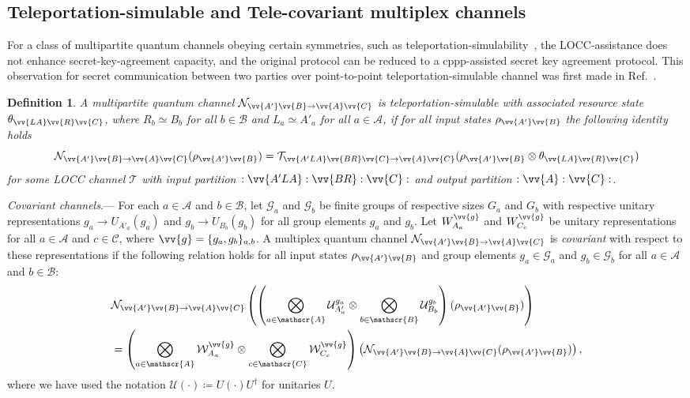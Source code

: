 \documentclass[aps,pra,twocolumn,superscriptaddress,longbibliography]{revtex4-1}
\def\({\left(}
\def\){\right)}
\newcommand{\mc}[1]{\mathcal{#1}}
\newcommand{\msc}[1]{\mathscr{#1}}
\newtheorem{definition}{Definition}
\begin{document}
\subsection{Teleportation-simulable and Tele-covariant multiplex channels}\label{sec:tele-cov}
For a class of multipartite quantum channels obeying certain symmetries, such as teleportation-simulability~\cite{BBPS96}, the LOCC-assistance does not enhance secret-key-agreement capacity, and the original protocol can be reduced to a cppp-assisted secret key agreement protocol. This observation for secret communication between two parties over point-to-point teleportation-simulable channel was first made in Ref.~\cite{PLOB15}.

\begin{definition}
A multipartite quantum channel $\mc{N}_{\vv{A'}\vv{B}\to\vv{A}\vv{C}}$ is teleportation-simulable with associated resource state $\theta_{\vv{LA}\vv{R}\vv{C}}$, where $R_b\simeq B_b$ for all $b\in\msc{B}$ and $L_a\simeq A'_a$ for all $a\in\msc{A}$, if for all input states $\rho_{\vv{A'}\vv{B}}$ the following identity holds
\begin{equation}\label{eq:tele-sim}
\mc{N}_{\vv{A'}\vv{B}\to\vv{A}\vv{C}}(\rho_{\vv{A'}\vv{B}})=\mc{T}_{\vv{A'LA}\vv{BR}\vv{C}\to\vv{A}\vv{C}}(\rho_{\vv{A'}\vv{B}}\otimes\theta_{\vv{LA}\vv{R}\vv{C}})
\end{equation} 
for some LOCC channel $\mc{T}$ with input partition $:\vv{A'LA}:\vv{BR}:\vv{C}:$ and output partition $:\vv{A}:\vv{C}:$.
\end{definition} 


\textit{Covariant channels}.--- For each $a\in\msc{A}$ and $b\in\msc{B}$, let $\msc{G}_a$ and $\msc{G}_b$ be finite groups of respective sizes $G_a$ and $G_b$ with respective unitary representations $g_a\rightarrow U_{A'_a}(g_a)$ and $g_b\rightarrow U_{B_b}(g_b)$ for all group elements $g_{a}$ and $g_{b}$. Let $W^{\vv{g}}_{A_a}$ and $W^{\vv{g}}_{C_c}$ be unitary representations for all $a\in\msc{A}$ and $c\in\msc{C}$, where $\vv{g}=\{g_a,g_b\}_{a,b}$. A multiplex quantum channel $\mc{N}_{\vv{A'}\vv{B}\to\vv{A}\vv{C}}$ is \textit{covariant} with respect to these representations if the following relation holds for all input states $\rho_{\vv{A'}\vv{B}}$ and group elements $g_a\in\msc{G}_a$ and $g_b\in\msc{G}_b$ for all $a\in\msc{A}$ and $b\in\msc{B}$: 
\begin{align}
&\mc{N}_{\vv{A'}\vv{B}\to\vv{A}\vv{C}}\(\(\bigotimes_{a\in\msc{A}}\mathcal{U}_{A'_a}^{g_a}\otimes\bigotimes_{b\in\msc{B}}\mathcal{U}_{B_b}^{g_b}\)(\rho_{\vv{A'}\vv{B}})\)\nonumber\\
&=\(\bigotimes_{a\in\msc{A}}\mathcal{W}_{A_a}^{\vv{g}}\otimes\bigotimes_{c\in\msc{C}}\mathcal{W}_{C_c}^{\vv{g}}\)\(\mc{N}_{\vv{A'}\vv{B}\to\vv{A}\vv{C}}(\rho_{\vv{A'}\vv{B}})\),
\end{align}
where we have used the notation $\mc{U}(\cdot)\coloneqq U(\cdot)U^{\dag}$ for unitaries $U$. 
\end{document}
